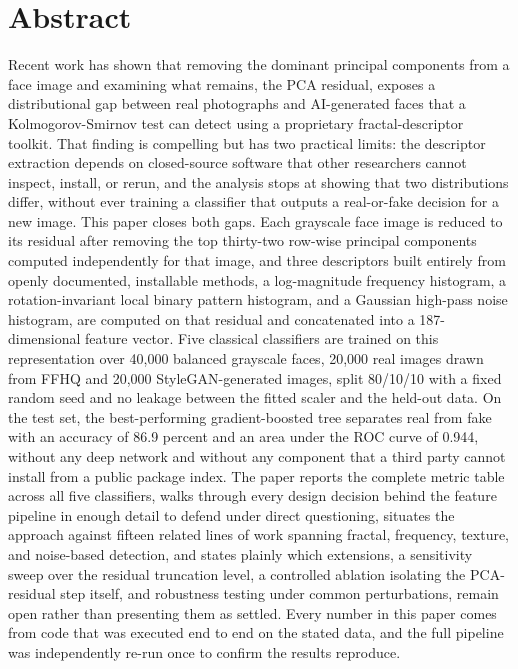\documentclass[11pt]{article}
\begin{document}
\section*{Abstract}
Recent work has shown that removing the dominant principal components from a face image and examining what remains, the PCA residual, exposes a distributional gap between real photographs and AI-generated faces that a Kolmogorov-Smirnov test can detect using a proprietary fractal-descriptor toolkit. That finding is compelling but has two practical limits: the descriptor extraction depends on closed-source software that other researchers cannot inspect, install, or rerun, and the analysis stops at showing that two distributions differ, without ever training a classifier that outputs a real-or-fake decision for a new image. This paper closes both gaps. Each grayscale face image is reduced to its residual after removing the top thirty-two row-wise principal components computed independently for that image, and three descriptors built entirely from openly documented, installable methods, a log-magnitude frequency histogram, a rotation-invariant local binary pattern histogram, and a Gaussian high-pass noise histogram, are computed on that residual and concatenated into a 187-dimensional feature vector. Five classical classifiers are trained on this representation over 40,000 balanced grayscale faces, 20,000 real images drawn from FFHQ and 20,000 StyleGAN-generated images, split 80/10/10 with a fixed random seed and no leakage between the fitted scaler and the held-out data. On the test set, the best-performing gradient-boosted tree separates real from fake with an accuracy of 86.9 percent and an area under the ROC curve of 0.944, without any deep network and without any component that a third party cannot install from a public package index. The paper reports the complete metric table across all five classifiers, walks through every design decision behind the feature pipeline in enough detail to defend under direct questioning, situates the approach against fifteen related lines of work spanning fractal, frequency, texture, and noise-based detection, and states plainly which extensions, a sensitivity sweep over the residual truncation level, a controlled ablation isolating the PCA-residual step itself, and robustness testing under common perturbations, remain open rather than presenting them as settled. Every number in this paper comes from code that was executed end to end on the stated data, and the full pipeline was independently re-run once to confirm the results reproduce.
\end{document}
